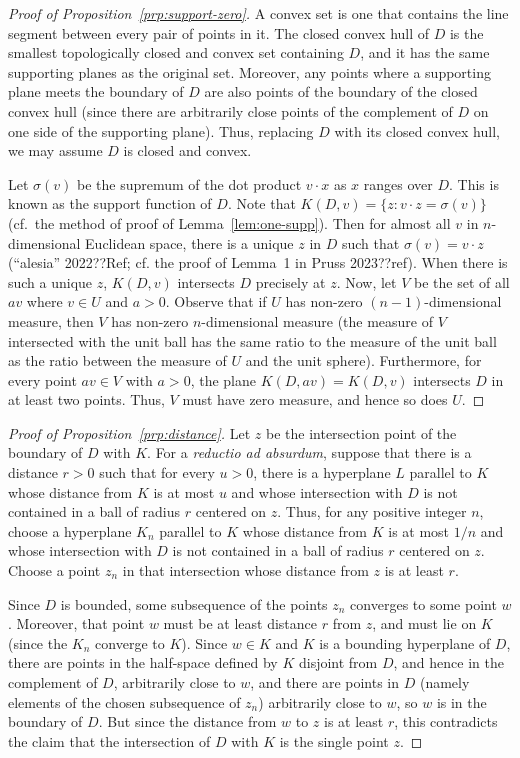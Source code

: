 \begin{proof}[Proof of Proposition~\ref{prp:support-zero}]
A convex set is one that contains the line segment between every pair of points in it. The closed convex hull of $D$ is the smallest topologically closed and convex set containing $D$, and it has the same supporting planes as the original set. Moreover, any points where a supporting plane meets the boundary of $D$ are also points of the boundary of the closed convex hull (since there are arbitrarily close points of the complement of $D$ on one side of the supporting plane). Thus, replacing $D$ with its closed convex hull, we may assume $D$ is closed and convex.

Let $\sigma(v)$ be the supremum of the dot product $v\cdot x$ as $x$ ranges over $D$. This is known as the support function of $D$. Note that $K(D,v) = \{ z : v\cdot z = \sigma(v) \}$ (cf.\ the method of proof of Lemma~\ref{lem:one-supp}). Then for almost all $v$ in $n$-dimensional Euclidean space, there is a unique $z$ in $D$ such that $\sigma(v) = v\cdot z$ (``alesia'' 2022??Ref; cf. the proof of Lemma~1 in Pruss 2023??ref). When there is such a unique $z$, $K(D,v)$ intersects $D$ precisely at $z$. Now, let $V$ be the set of all $av$ where $v\in U$ and $a>0$. Observe that if $U$ has non-zero $(n-1)$-dimensional measure, then $V$ has non-zero $n$-dimensional measure (the measure of $V$ intersected with the unit ball has the same ratio to the measure of the unit ball as the ratio between the measure of $U$ and the unit sphere). Furthermore, for every point $av\in V$ with $a>0$, the plane $K(D,av)=K(D,v)$ intersects $D$ in at least two points. Thus, $V$ must have zero measure, and hence so does $U$.
\end{proof}

\begin{proof}[Proof of Proposition~\ref{prp:distance}]
Let $z$ be the intersection point of the boundary of $D$ with $K$. For a \textit{reductio ad absurdum}, suppose that there is a distance $r>0$ such that for every $u>0$, there is a hyperplane $L$ parallel to $K$ whose distance from $K$ is at most $u$ and whose intersection with $D$ is not contained in a ball of radius $r$ centered on $z$. Thus, for any positive integer $n$, choose a hyperplane $K_n$ parallel to $K$ whose distance from $K$ is at most $1/n$ and whose intersection with $D$ is not contained in a ball of radius $r$ centered on $z$. Choose a point $z_n$ in that intersection whose distance from $z$ is at least $r$. 

Since $D$ is bounded, some subsequence of the points $z_n$ converges to some point $w$. Moreover, that point $w$ must be at least distance $r$ from $z$, and must lie on $K$ (since the $K_n$ converge to $K$). Since $w\in K$ and $K$ is a bounding hyperplane of $D$, there are points in the half-space defined by $K$ disjoint from $D$, and hence in the complement of $D$, arbitrarily close to $w$, and there are points in $D$ (namely elements of the chosen subsequence of $z_n$) arbitrarily close to $w$, so $w$ is in the boundary of $D$. But since the distance from $w$ to $z$ is at least $r$, this contradicts the claim that the intersection of $D$ with $K$ is the single point $z$.
\end{proof}


\chaptertail 


